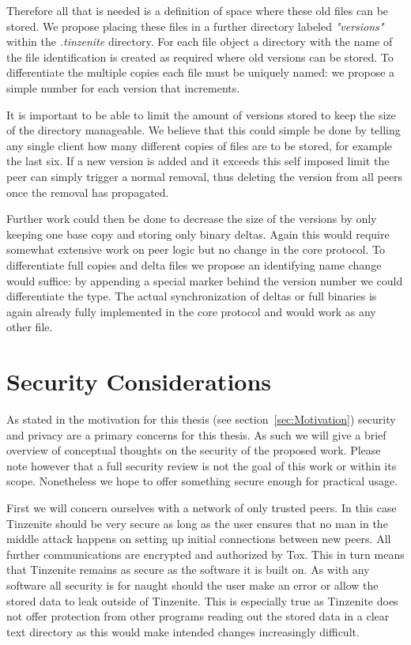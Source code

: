 Therefore all that is needed is a definition of space where these old files can be stored.
We propose placing these files in a further directory labeled \textit{"versions"} within the \textit{.tinzenite} directory.
For each file object a directory with the name of the file identification is created as required where old versions can be stored.
To differentiate the multiple copies each file must be uniquely named: we propose a simple number for each version that increments.

It is important to be able to limit the amount of versions stored to keep the size of the directory manageable.
We believe that this could simple be done by telling any single client how many different copies of files are to be stored, for example the last six.
If a new version is added and it exceeds this self imposed limit the peer can simply trigger a normal removal, thus deleting the version from all peers once the removal has propagated.

Further work could then be done to decrease the size of the versions by only keeping one base copy and storing only binary deltas.
Again this would require somewhat extensive work on peer logic but no change in the core protocol.
To differentiate full copies and delta files we propose an identifying name change would suffice: by appending a special marker behind the version number we could differentiate the type.
The actual synchronization of deltas or full binaries is again already fully implemented in the core protocol and would work as any other file.

\section{Security Considerations}
\label{sec:Security Considerations}

As stated in the motivation for this thesis (see section~\ref{sec:Motivation}) security and privacy are a primary concerns for this thesis.
As such we will give a brief overview of conceptual thoughts on the security of the proposed work.
Please note however that a full security review is not the goal of this work or within its scope.
Nonetheless we hope to offer something secure enough for practical usage.

First we will concern ourselves with a network of only trusted peers.
In this case Tinzenite should be very secure as long as the user ensures that no man in the middle attack happens on setting up initial connections between new peers.
All further communications are encrypted and authorized by Tox.
This in turn means that Tinzenite remains as secure as the software it is built on.
As with any software all security is for naught should the user make an error or allow the stored data to leak outside of Tinzenite.
This is especially true as Tinzenite does not offer protection from other programs reading out the stored data in a clear text directory as this would make intended changes increasingly difficult.

